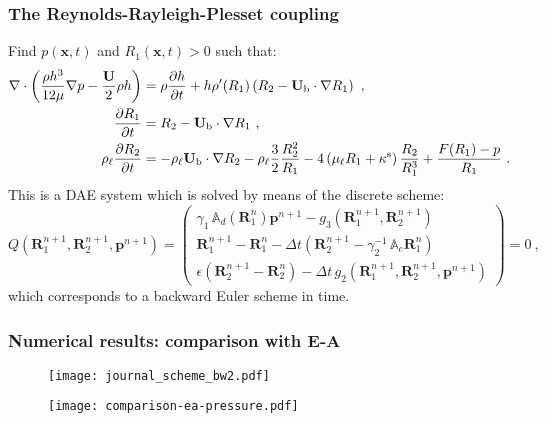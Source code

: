 \documentclass[10pt,aspectratio=169]{beamer}
\begin{document}
\begin{frame}
\frametitle{The Reynolds-Rayleigh-Plesset coupling}
\vspace*{0.5cm}
Find $p(\mathbf{x},t)$ and $R_1(\mathbf{x},t)>0$ such that:
\begin{align*}
\nabla\cdot \left(\frac{\rho h^3}{12\mu}\nabla p-\frac{\mathbf{U}}{2}\rho h\right)&=\rho \frac{\partial h}{\partial t}+h \rho'(R_1)\left(R_2-\mathbf{U}_\textnormal{b}\cdot\nabla R_1\right)~,\\
\frac{\partial R_1}{\partial t}&=R_2-\mathbf{U}_\textnormal{b}\cdot \nabla R_1~,\\
\rho_\ell\frac{\partial R_2}{\partial t}&=-\rho_\ell\mathbf{U}_\textnormal{b}\cdot \nabla R_2-\rho_\ell\frac{3}{2}\frac{R_2^2}{R_1}-4\left(\mu_\ell R_1+\kappa^\textnormal{s}\right)\frac{R_2}{R_1^3}+\frac{F(R_1)-p}{R_1}~.
\end{align*}	
This is a DAE system which is solved by means of the discrete scheme:
 \begin{equation*}
Q\left( \mathbf{R}_1^{n+1},\mathbf{R}_2^{n+1},\mathbf{p}^{n+1}\right)
=\begin{pmatrix}
\gamma_1\,\mathbb{A}_d\left(\mathbf{R}_1^{n}\right)\mathbf{p}^{n+1}-g_3(\mathbf{R}_1^{n+1},\mathbf{R}_2^{n+1})\\
\mathbf{R}_1^{n+1}-\mathbf{R}_1^n-\Delta t\left(\mathbf{R}_2^{n+1}-\gamma_2^{-1}\,\mathbb{A}_c \mathbf{R}_1^{n}\right)\\
\epsilon \left(\mathbf{R}_2^{n+1}-\mathbf{R}_2^n\right)-\Delta t\, g_2(\mathbf{R}_1^{n+1},\mathbf{R}_2^{n+1},\mathbf{p}^{n+1})
\end{pmatrix}=0~,
\end{equation*}
which corresponds to a backward Euler scheme in time.
\end{frame} 

\begin{frame}
\frametitle{Numerical results: comparison with E-A}
\vspace*{1.0cm}
\begin{minipage}{0.5\linewidth}
	\begin{figure}
	\texttt{[image: journal\_scheme\_bw2.pdf]}
\end{figure}
\end{minipage}%
\begin{minipage}{0.5\linewidth}
	\begin{figure}
		\texttt{[image: comparison-ea-pressure.pdf]}
	\end{figure}
\end{minipage}
\end{frame}  
\end{document}
